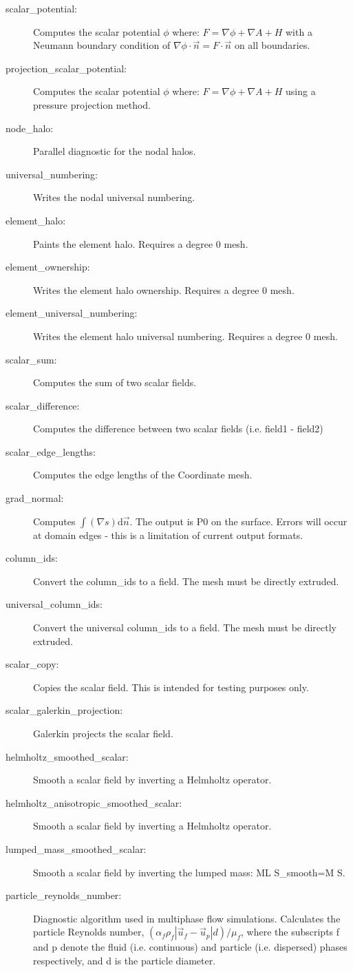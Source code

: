 \begin{description}
\item[scalar\_potential:]Computes the scalar potential $\phi$ where: $F = \nabla\phi + \nabla A + H$ with a Neumann boundary condition of $\nabla\phi \cdot \vec{n} = F \cdot \vec{n}$ on all boundaries.
\item[projection\_scalar\_potential:]Computes the scalar potential $\phi$ where: $F = \nabla\phi + \nabla A + H$ using a pressure projection method.
\item[node\_halo:]Parallel diagnostic for the nodal halos.
\item[universal\_numbering:]Writes the nodal universal numbering.
\item[element\_halo:]Paints the element halo. Requires a degree 0 mesh.
\item[element\_ownership:]Writes the element halo ownership. Requires a degree 0 mesh.
\item[element\_universal\_numbering:]Writes the element halo universal numbering. Requires a degree 0 mesh.
\item[scalar\_sum:]Computes the sum of two scalar fields.
\item[scalar\_difference:]Computes the difference between two scalar fields (i.e. field1 - field2)
\item[scalar\_edge\_lengths:]Computes the edge lengths of the Coordinate mesh.
\item[grad\_normal:]Computes $\int{(\nabla s) \mathrm{d}\vec{n}}$. The output is P0 on the surface. Errors will occur at domain edges - this is a limitation of current output formats.
\item[column\_ids:] Convert the column\_ids to a field. The mesh must be directly extruded.
\item[universal\_column\_ids:]Convert the universal column\_ids to a field. The mesh must be directly extruded.
\item[scalar\_copy:]Copies the scalar field. This is intended for testing purposes only.
\item[scalar\_galerkin\_projection:]Galerkin projects the scalar field.
\item[helmholtz\_smoothed\_scalar:]Smooth a scalar field by inverting a Helmholtz operator.
\item[helmholtz\_anisotropic\_smoothed\_scalar:]Smooth a scalar field by inverting a Helmholtz operator.
\item[lumped\_mass\_smoothed\_scalar:]Smooth a scalar field by inverting the lumped mass: ML {S\_smooth}=M {S}.
\item[particle\_reynolds\_number:]Diagnostic algorithm used in multiphase flow simulations. Calculates the particle Reynolds number, $(\alpha_f\rho_f|\vec{u}_f - \vec{u}_p|d)/\mu_f$, where the subscripts f and p denote the fluid (i.e. continuous) and particle (i.e. dispersed) phases respectively, and d is the particle diameter.

\end{description}

